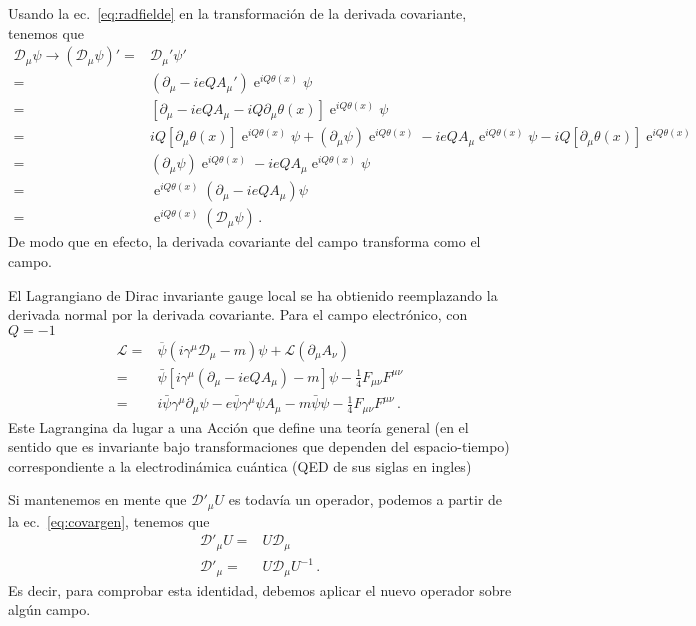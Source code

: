 \begin{frame}
Usando la ec.~\eqref{eq:radfielde} en la transformación de la derivada covariante, tenemos que
\begin{align}
 \mathcal{D}_{\mu}\psi\to \left(  \mathcal{D}_{\mu}\psi \right)'=& \mathcal{D}_{\mu}'\psi' \nonumber\\
                       =& \left( \partial_{\mu}-ieQA_{\mu}' \right)\operatorname{e}^{iQ\theta(x)}\psi \nonumber\\
  =& \left[ \partial_{\mu}-ieQA_{\mu}-iQ\partial_{\mu}\theta(x) \right]\operatorname{e}^{iQ\theta(x)}\psi \nonumber\\
  =& iQ \left[ \partial_{\mu}\theta(x) \right]\operatorname{e}^{iQ\theta(x)}\psi+\left( \partial_{\mu}\psi \right)\operatorname{e}^{iQ\theta(x)}
     -ieQA_{\mu}\operatorname{e}^{iQ\theta(x)}\psi
     -iQ \left[ \partial_{\mu}\theta(x) \right]\operatorname{e}^{iQ\theta(x)} \nonumber\\
  =&\left( \partial_{\mu}\psi \right)\operatorname{e}^{iQ\theta(x)}
     -ieQA_{\mu}\operatorname{e}^{iQ\theta(x)}\psi \nonumber\\
=& \operatorname{e}^{iQ\theta(x)}  \left( \partial_{\mu} -ieQA_{\mu}\right)\psi \nonumber\\
=& \operatorname{e}^{iQ\theta(x)} \left( \mathcal{D}_{\mu}\psi \right)\,.
\end{align}
De modo que en efecto, la derivada covariante del campo transforma como el campo.


El Lagrangiano de Dirac invariante gauge local se ha obtienido reemplazando la derivada normal por la derivada covariante. Para el campo electrónico, con $Q=-1$
\begin{align}
  \mathcal{L}=&\overline{\psi}\left(i\gamma^\mu\mathcal{D}_\mu-m\right)\psi+\mathcal{L}\left( \partial_{\mu}A_{\nu}\right)\nonumber\\
=&\bar{\psi}\left[i\gamma^\mu\left(\partial_\mu-ieQA_\mu\right)-m\right]\psi-\frac{1}{4}F_{\mu\nu}F^{\mu\nu}\nonumber\\
=&i\bar{\psi}\gamma^\mu\partial_\mu\psi -e\bar{\psi}\gamma^\mu \psi A_\mu-m\bar{\psi}\psi -\frac{1}{4}F_{\mu\nu}F^{\mu\nu}\,.
\end{align}
Este Lagrangina da lugar a una Acción que define una teoría general (en el sentido que es invariante bajo transformaciones que dependen del espacio-tiempo) correspondiente a  la electrodinámica cuántica (QED de sus siglas en ingles)

Si mantenemos en mente que  $\mathcal{D}'_\mu U$ es todavía un operador, podemos a partir de la ec.~\eqref{eq:covargen},
tenemos que
\begin{align}
    \mathcal{D}'_\mu U=&U\mathcal{D}_\mu \nonumber\\
    \mathcal{D}'_\mu =&U\mathcal{D}_\mu U^{-1} \,.
\end{align}
Es decir, para comprobar esta identidad, debemos aplicar el nuevo operador sobre algún campo.



\end{frame}

